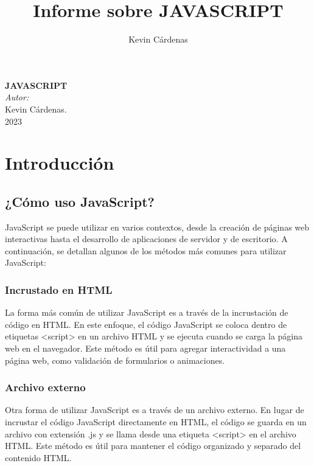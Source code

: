 \documentclass[executivepaper]{article}
\title{Informe sobre JAVASCRIPT}
\author{Kevin Cárdenas}
\begin{document}
\begin{titlepage}
    \begin{center}
        {\Huge \textbf{JAVASCRIPT}}
        \\[18cm]

        \large\emph{Autor:}\\
        Kevin Cárdenas.
        \\[1cm]
        {\large 2023}
    \end{center}
\end{titlepage}

\newpage
\tableofcontents
\newpage

\section{Introducción}

\subsection{¿Cómo uso JavaScript?}

JavaScript se puede utilizar en varios contextos, desde la creación de páginas web interactivas hasta el desarrollo de aplicaciones de servidor y de escritorio. A continuación, se detallan algunos de los métodos más comunes para utilizar JavaScript:

\subsubsection*{Incrustado en HTML}

La forma más común de utilizar JavaScript es a través de la incrustación de código en HTML. En este enfoque, el código JavaScript se coloca dentro de etiquetas <script> en un archivo HTML y se ejecuta cuando se carga la página web en el navegador. Este método es útil para agregar interactividad a una página web, como validación de formularios o animaciones.

\subsubsection*{Archivo externo}

Otra forma de utilizar JavaScript es a través de un archivo externo. En lugar de incrustar el código JavaScript directamente en HTML, el código se guarda en un archivo con extensión .js y se llama desde una etiqueta <script> en el archivo HTML. Este método es útil para mantener el código organizado y separado del contenido HTML.
\end{document}
